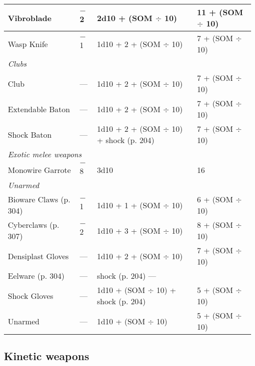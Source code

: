 {{\begin{table}
\begin{tabularx}{\textwidth}{|l|X|l|l|}
Vibroblade	&$-$2	&2d10 + (SOM $\div$ 10)	&11 + (SOM $\div$ 10) \\ \hline

Wasp Knife	&$-$1	&1d10 + 2 + (SOM $\div$ 10)	&7 + (SOM $\div$ 10) \\ \hline

\multicolumn{4}{|l|}{\emph{Clubs}} \\ \hline

Club	&--- &1d10 + 2 + (SOM $\div$ 10)	&7 + (SOM $\div$ 10) \\ \hline

Extendable Baton	&--- &1d10 + 2 + (SOM $\div$ 10)	&7 + (SOM $\div$ 10) \\ \hline

Shock Baton	&--- &1d10 + 2 + (SOM $\div$ 10) + shock (p. 204)	&7 + (SOM $\div$ 10) \\ \hline

\multicolumn{4}{|l|}{\emph{Exotic melee weapons}} \\ \hline

Monowire Garrote	&$-$8	&3d10	&16 \\ \hline

\multicolumn{4}{|l|}{\emph{Unarmed}} \\ \hline

Bioware Claws (p. 304)	&$-$1	&1d10 + 1 + (SOM $\div$ 10)	&6 + (SOM $\div$ 10) \\ \hline

Cyberclaws (p. 307)	&$-$2	&1d10 + 3 + (SOM $\div$ 10)	&8 + (SOM $\div$ 10) \\ \hline

Densiplast Gloves	&--- &1d10 + 2 + (SOM $\div$ 10)	&7 + (SOM $\div$ 10) \\ \hline

Eelware (p. 304)	&--- &shock (p. 204)	--- \\ \hline

Shock Gloves	&--- &1d10 + (SOM $\div$ 10) + shock (p. 204)	&5 + (SOM $\div$ 10) \\ \hline

Unarmed	&--- &1d10 + (SOM $\div$ 10)	&5 + (SOM $\div$ 10) \\ \hline

\end{tabularx} \label{tab:meleeweapons} \end{table} 



\subsection{Kinetic weapons} \label{sec:kinetic-weapons} 

}}
